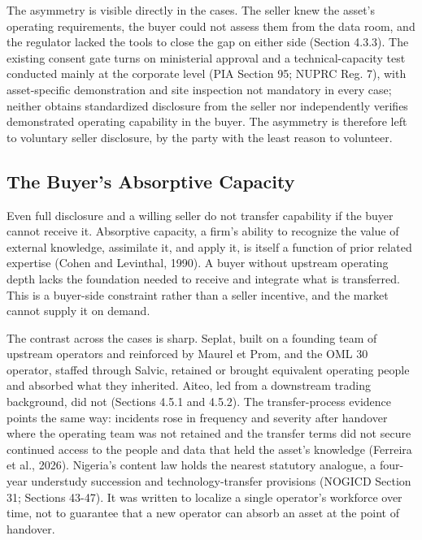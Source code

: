 \documentclass[twoside,fontset=lmodern]{mitthesis}
\begin{document}
The asymmetry is visible directly in the cases. The seller knew the
asset's operating requirements, the buyer could not assess them from the
data room, and the regulator lacked the tools to close the gap on either
side (Section 4.3.3). The existing consent gate turns on ministerial
approval and a technical-capacity test conducted mainly at the corporate
level (PIA Section 95; NUPRC Reg. 7), with asset-specific demonstration
and site inspection not mandatory in every case; neither obtains
standardized disclosure from the seller nor independently verifies
demonstrated operating capability in the buyer. The asymmetry is
therefore left to voluntary seller disclosure, by the party with the
least reason to volunteer.

\hypertarget{the-buyers-absorptive-capacity}{%
\subsection{The Buyer's Absorptive
Capacity}\label{the-buyers-absorptive-capacity}}

Even full disclosure and a willing seller do not transfer capability if
the buyer cannot receive it. Absorptive capacity, a firm's ability to
recognize the value of external knowledge, assimilate it, and apply it,
is itself a function of prior related expertise (Cohen and Levinthal,
1990). A buyer without upstream operating depth lacks the foundation
needed to receive and integrate what is transferred. This is a
buyer-side constraint rather than a seller incentive, and the market
cannot supply it on demand.

The contrast across the cases is sharp. Seplat, built on a founding team
of upstream operators and reinforced by Maurel et Prom, and the OML 30
operator, staffed through Salvic, retained or brought equivalent
operating people and absorbed what they inherited. Aiteo, led from a
downstream trading background, did not (Sections 4.5.1 and 4.5.2). The
transfer-process evidence points the same way: incidents rose in
frequency and severity after handover where the operating team was not
retained and the transfer terms did not secure continued access to the
people and data that held the asset's knowledge (Ferreira et al., 2026).
Nigeria's content law holds the nearest statutory analogue, a four-year
understudy succession and technology-transfer provisions (NOGICD Section
31; Sections 43-47). It was written to localize a single operator's
workforce over time, not to guarantee that a new operator can absorb an
asset at the point of handover.
\end{document}
